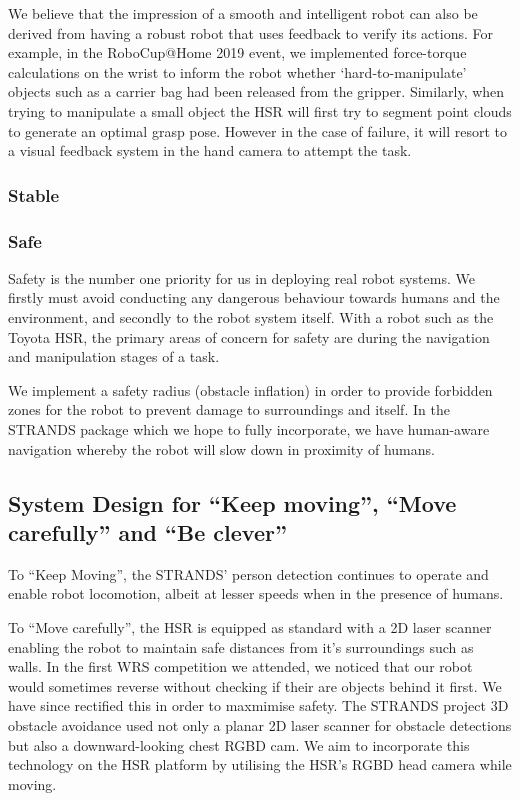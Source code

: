 \documentclass[runningheads,a4paper]{llncs}
\begin{document}
We believe that the impression of a smooth and intelligent robot can also be derived from having a robust robot that uses feedback to verify its actions. For example, in the RoboCup@Home 2019 event, we implemented force-torque calculations on the wrist to inform the robot whether `hard-to-manipulate' objects such as a carrier bag had been released from the gripper. Similarly, when trying to manipulate a small object the HSR will first try to segment point clouds to generate an optimal grasp pose. However in the case of failure, it will resort to a visual feedback system in the hand camera to attempt the task.

\subsubsection{Stable}


\subsubsection{Safe}
Safety is the number one priority for us in deploying real robot systems. We firstly must avoid conducting any dangerous behaviour towards humans and the environment, and secondly to the robot system itself. With a robot such as the Toyota HSR, the primary areas of concern for safety are during the navigation and manipulation stages of a task. 

We implement a safety radius (obstacle inflation) in order to provide forbidden zones for the robot to prevent damage to surroundings and itself. In the STRANDS package which we hope to fully incorporate, we have human-aware navigation whereby the robot will slow down in proximity of humans. 

\subsection{System Design for “Keep moving”, “Move carefully” and “Be clever”}
To ``Keep Moving'', the STRANDS’ person detection continues to operate and enable robot locomotion, albeit at lesser speeds when in the presence of humans.

To “Move carefully”, the HSR is equipped as standard with a 2D laser scanner enabling the robot to maintain safe distances from it's surroundings such as walls. In the first WRS competition we attended, we noticed that our robot would sometimes reverse without checking if their are objects behind it first. We have since rectified this in order to maxmimise safety. The STRANDS project 3D obstacle avoidance used not only a planar 2D laser scanner for obstacle detections but also a downward-looking chest RGBD cam. We aim to incorporate this technology on the HSR platform by utilising the HSR's RGBD head camera while moving. 
\end{document}
